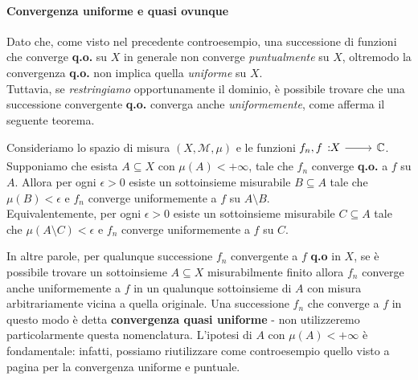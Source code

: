 \paragraph{Convergenza uniforme e quasi ovunque}
Dato che, come visto nel precedente controesempio, una successione di funzioni che converge \textbf{q.o.} su $X$ in generale non converge \textit{puntualmente} su $X$, oltremodo la convergenza \textbf{q.o.} non implica quella \textit{uniforme} su $X$.\\
Tuttavia, se \textit{restringiamo} opportunamente il dominio, è possibile trovare che una successione convergente \textbf{q.o.} converga anche \textit{uniformemente}, come afferma il seguente teorema.
\begin{theoremaqed}
	Consideriamo lo spazio di misura $\left(X,\mathcal{M},\mu\right)$ e le funzioni $\funz{f_n,f}{X}{\complexset}$.\\
	Supponiamo che esista $A\subseteq X$ con $\mu(A)<+\infty$, tale che $f_n$ converge \textbf{q.o.} a $f$ su $A$. Allora per ogni $\epsilon>0$ esiste un sottoinsieme misurabile $B\subseteq A$ tale che $\mu(B)< \epsilon$ e $f_n$ converge uniformemente a $f$ su $A\setminus B$.\\
	Equivalentemente, per ogni $\epsilon>0$ esiste un sottoinsieme misurabile $C\subseteq A$ tale che $\mu(A\setminus C)<\epsilon$  e $f_n$ converge uniformemente a $f$ su $C$.
\end{theoremaqed}
In altre parole, per qualunque successione $f_n$ convergente a $f$ \textbf{q.o} in $X$, se è possibile trovare un sottoinsieme $A\subseteq X$ misurabilmente finito allora $f_n$ converge anche uniformemente a $f$ in un qualunque sottoinsieme di $A$ con misura arbitrariamente vicina a quella originale. Una successione $f_n$ che converge a $f$ in questo modo è detta \textbf{convergenza quasi uniforme} - non utilizzeremo particolarmente questa nomenclatura.
L'ipotesi di $A$ con $\mu(A)<+\infty$ è fondamentale: infatti, possiamo riutilizzare come controesempio quello visto a pagina \pageref{controesempiouniformepuntuale} per la convergenza uniforme e puntuale.
